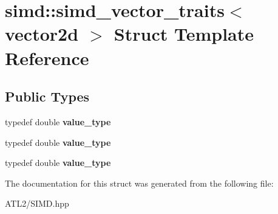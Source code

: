 \hypertarget{structsimd_1_1simd__vector__traits_3_01vector2d_01_4}{\section{simd\+:\+:simd\+\_\+vector\+\_\+traits$<$ vector2d $>$ Struct Template Reference}
\label{structsimd_1_1simd__vector__traits_3_01vector2d_01_4}
}
\subsection*{Public Types}
\begin{DoxyCompactItemize}
\item 
\hypertarget{structsimd_1_1simd__vector__traits_3_01vector2d_01_4_a734661b8f2e269d2f525dd0555e54b1d}{typedef double {\bfseries value\+\_\+type}}\label{structsimd_1_1simd__vector__traits_3_01vector2d_01_4_a734661b8f2e269d2f525dd0555e54b1d}

\item 
\hypertarget{structsimd_1_1simd__vector__traits_3_01vector2d_01_4_a734661b8f2e269d2f525dd0555e54b1d}{typedef double {\bfseries value\+\_\+type}}\label{structsimd_1_1simd__vector__traits_3_01vector2d_01_4_a734661b8f2e269d2f525dd0555e54b1d}

\item 
\hypertarget{structsimd_1_1simd__vector__traits_3_01vector2d_01_4_a734661b8f2e269d2f525dd0555e54b1d}{typedef double {\bfseries value\+\_\+type}}\label{structsimd_1_1simd__vector__traits_3_01vector2d_01_4_a734661b8f2e269d2f525dd0555e54b1d}

\end{DoxyCompactItemize}


The documentation for this struct was generated from the following file\+:\begin{DoxyCompactItemize}
\item 
A\+T\+L2/S\+I\+M\+D.\+hpp\end{DoxyCompactItemize}
